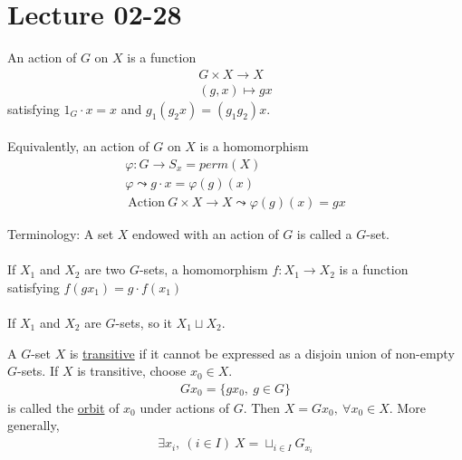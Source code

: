 \documentclass[class=scrartcl, crop=false]{standalone}
\date{2020-02-28}
\begin{document}
\section{Lecture 02-28}

An action of $G$ on $X$ is a function
\begin{gather*}
  G \times X \to X \\
  (g, x) \mapsto gx
\end{gather*} 
satisfying $1_G \cdot x = x$ and $g_1(g_2x) = (g_1g_2)x$.
\\\\
Equivalently, an action of $G$ on $X$ is a homomorphism
\begin{gather*}
  \varphi: G \to S_x = perm(X) \\
  \varphi \leadsto g \cdot x = \varphi(g)(x) \\
  \ \text{Action} \ G \times X \to X \leadsto \varphi(g)(x) = gx
\end{gather*} 

Terminology: A set $X$ endowed with an action of $G$ is called a $G$-set.
\\\\
If $X_1$ and $X_2$ are two $G$-sets, a homomorphism $f: X_1 \to X_2$ is a function satisfying $f(gx_1) = g \cdot f(x_1)$
\\\\
If $X_1$ and $X_2$ are $G$-sets, so it $X_1 \sqcup X_2$.
\begin{definition}
  A $G$-set $X$ is \ul{transitive} if it cannot be expressed as a disjoin union of non-empty $G$-sets. If $X$ is transitive, choose $x_0 \in X$.
  \begin{gather*}
    Gx_0 = \{gx_0, \ g \in G\}
  \end{gather*} 
  is called the \ul{orbit} of $x_0$ under actions of $G$. Then $X = Gx_0, \ \forall x_0 \in X$. More generally, 
  \begin{gather*}
    \exists x_i, \ (i \in I) \ X = \sqcup_{i \in I}G_{x_i}
  \end{gather*} 
\end{definition} 
\end{document}
